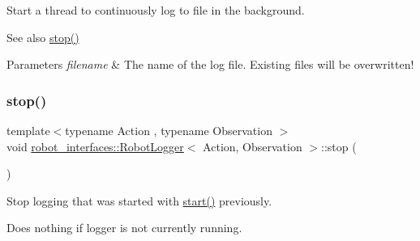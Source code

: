 Start a thread to continuously log to file in the background. 

\begin{DoxySeeAlso}{See also}
\hyperlink{classrobot__interfaces_1_1RobotLogger_a55ec7dcacd849adee53fa49a2a0c8234}{stop()} 
\end{DoxySeeAlso}

\begin{DoxyParams}{Parameters}
{\em filename} & The name of the log file. Existing files will be overwritten! \\
\hline
\end{DoxyParams}
\mbox{\label{classrobot__interfaces_1_1RobotLogger_a55ec7dcacd849adee53fa49a2a0c8234}} 
\subsubsection{\texorpdfstring{stop()}{stop()}}
{\footnotesize\ttfamily template$<$typename Action , typename Observation $>$ \\
void \hyperlink{classrobot__interfaces_1_1RobotLogger}{robot\+\_\+interfaces\+::\+Robot\+Logger}$<$ Action, Observation $>$\+::stop (\begin{DoxyParamCaption}{ }\end{DoxyParamCaption})\hspace{0.3cm}{\ttfamily [inline]}}



Stop logging that was started with {\ttfamily \hyperlink{classrobot__interfaces_1_1RobotLogger_a7a1b50c75aab3255ac7e6d412de833d1}{start()}} previously. 

Does nothing if logger is not currently running. \mbox{\label{classrobot__interfaces_1_1RobotLogger_a36b22a51e9615ee696a5baa350d3dee0}} 
